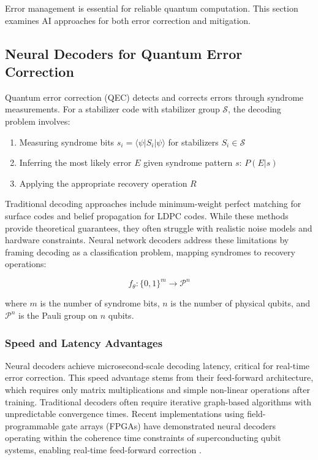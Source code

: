 Error management is essential for reliable quantum computation. This section examines AI approaches for both error correction and mitigation.

\subsection{Neural Decoders for Quantum Error Correction}

Quantum error correction (QEC) detects and corrects errors through syndrome measurements. For a stabilizer code with stabilizer group $\mathcal{S}$, the decoding problem involves:

\begin{enumerate}
    \item Measuring syndrome bits $s_i = \langle \psi | S_i | \psi \rangle$ for stabilizers $S_i \in \mathcal{S}$
    \item Inferring the most likely error $E$ given syndrome pattern $s$: $P(E|s)$
    \item Applying the appropriate recovery operation $R$
\end{enumerate}

Traditional decoding approaches include minimum-weight perfect matching for surface codes and belief propagation for LDPC codes. While these methods provide theoretical guarantees, they often struggle with realistic noise models and hardware constraints. Neural network decoders address these limitations by framing decoding as a classification problem, mapping syndromes to recovery operations:

\begin{equation}
f_\theta: \{0,1\}^m \rightarrow \mathcal{P}^n
\end{equation}

where $m$ is the number of syndrome bits, $n$ is the number of physical qubits, and $\mathcal{P}^n$ is the Pauli group on $n$ qubits.

\subsubsection{Speed and Latency Advantages}

Neural decoders achieve microsecond-scale decoding latency, critical for real-time error correction. This speed advantage stems from their feed-forward architecture, which requires only matrix multiplications and simple non-linear operations after training. Traditional decoders often require iterative graph-based algorithms with unpredictable convergence times. Recent implementations using field-programmable gate arrays (FPGAs) have demonstrated neural decoders operating within the coherence time constraints of superconducting qubit systems, enabling real-time feed-forward correction \cite{ryan2021realization}.

